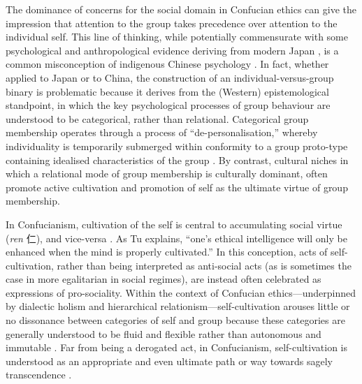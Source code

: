 \begin{CJK}{UTF8}{gbsn}
The dominance of concerns for the social domain in Confucian ethics can give the impression that attention to the group takes precedence over attention to the individual self.  This line of thinking, while potentially commensurate with some psychological and anthropological evidence deriving from modern Japan \citep{Kitayama2010b}, is a common misconception of indigenous Chinese psychology \citep{Tu1998}.  In fact, whether applied to Japan or to China, the construction of an individual-versus-group binary is problematic because it derives from the (Western) epistemological standpoint, in which the key psychological processes of group behaviour are understood to be categorical, rather than relational.  Categorical group membership operates through a process of ``de-personalisation,'' whereby individuality is temporarily submerged within conformity to a group proto-type containing idealised characteristics of the group \citep{Turner1987}.  By contrast, cultural niches in which a relational mode of group membership is culturally dominant, often promote active cultivation and promotion of self as the ultimate virtue of group membership.

In Confucianism, cultivation of the self is central to accumulating social virtue (\textit{ren} 仁), and vice-versa \citep{Hwang2012}. As Tu explains, ``one's ethical intelligence will only be enhanced when the mind is properly cultivated.''  In this conception, acts of self-cultivation, rather than being interpreted as anti-social acts (as is sometimes the case in more egalitarian in social regimes), are instead often celebrated as expressions of pro-sociality.  Within the context of Confucian ethics---underpinned by dialectic holism and hierarchical relationism---self-cultivation arouses little or no dissonance between categories of self and group because these categories are generally understood to be fluid and flexible rather than autonomous and immutable \citep{Nisbett2003}.  Far from being a derogated act, in Confucianism, self-cultivation is understood as an appropriate and even ultimate path or way towards sagely transcendence \citep[106]{Hwang2012}.


\end{CJK}
